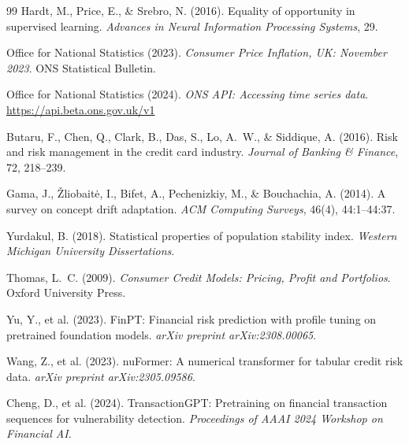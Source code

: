 \documentclass[12pt, a4paper]{article}
\begin{document}
\begin{thebibliography}{99}
Hardt, M., Price, E., \& Srebro, N. (2016).
Equality of opportunity in supervised learning.
\textit{Advances in Neural Information Processing Systems}, 29.

Office for National Statistics (2023).
\textit{Consumer Price Inflation, UK: November 2023}.
ONS Statistical Bulletin.

Office for National Statistics (2024).
\textit{ONS API: Accessing time series data}.
\url{https://api.beta.ons.gov.uk/v1}

Butaru, F., Chen, Q., Clark, B., Das, S., Lo, A.~W., \& Siddique, A. (2016).
Risk and risk management in the credit card industry.
\textit{Journal of Banking \& Finance}, 72, 218--239.

Gama, J., {\v{Z}}liobait{\.e}, I., Bifet, A., Pechenizkiy, M., \& Bouchachia, A. (2014).
A survey on concept drift adaptation.
\textit{ACM Computing Surveys}, 46(4), 44:1--44:37.

Yurdakul, B. (2018).
Statistical properties of population stability index.
\textit{Western Michigan University Dissertations}.

Thomas, L.~C. (2009).
\textit{Consumer Credit Models: Pricing, Profit and Portfolios}.
Oxford University Press.

Yu, Y., et al. (2023).
FinPT: Financial risk prediction with profile tuning on pretrained foundation models.
\textit{arXiv preprint arXiv:2308.00065}.

Wang, Z., et al. (2023).
nuFormer: A numerical transformer for tabular credit risk data.
\textit{arXiv preprint arXiv:2305.09586}.

Cheng, D., et al. (2024).
TransactionGPT: Pretraining on financial transaction sequences for vulnerability detection.
\textit{Proceedings of AAAI 2024 Workshop on Financial AI}.

\end{thebibliography}
\end{document}
